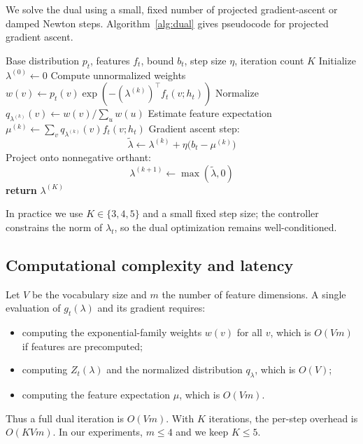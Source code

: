 \documentclass{article}
\theoremstyle{plain}
\theoremstyle{definition}
\theoremstyle{remark}
\begin{document}
We solve the dual using a small, fixed number of projected gradient-ascent or damped Newton steps.
Algorithm~\ref{alg:dual} gives pseudocode for projected gradient ascent.

\begin{algorithm}[t]
  \caption{Projected dual ascent for KL-based CaLaM}
  \label{alg:dual}
  \small
  \begin{algorithmic}[1]
    \REQUIRE Base distribution $p_t$, features $f_t$, bound $b_t$, step size $\eta$, iteration count $K$
    \STATE Initialize $\lambda^{(0)} \leftarrow 0$
      \STATE Compute unnormalized weights $w(v) \leftarrow p_t(v)\exp(-(\lambda^{(k)})^\top f_t(v;h_t))$
      \STATE Normalize $q_{\lambda^{(k)}}(v) \leftarrow w(v) / \sum_u w(u)$
      \STATE Estimate feature expectation $\mu^{(k)} \leftarrow \sum_v q_{\lambda^{(k)}}(v) f_t(v;h_t)$
      \STATE Gradient ascent step:
      \[
        \tilde{\lambda} \leftarrow \lambda^{(k)} + \eta\big(b_t - \mu^{(k)}\big)
      \]
      \STATE Project onto nonnegative orthant:
      \[
        \lambda^{(k+1)} \leftarrow \max(\tilde{\lambda}, 0)
      \]
    \ENDFOR
    \STATE \textbf{return} $\lambda^{(K)}$
  \end{algorithmic}
\end{algorithm}

In practice we use $K \in \{3,4,5\}$ and a small fixed step size; the controller constrains the norm of $\lambda_t$, so the dual optimization remains well-conditioned.

\subsection{Computational complexity and latency}
\label{app:complexity}

Let $V$ be the vocabulary size and $m$ the number of feature dimensions.
A single evaluation of $g_t(\lambda)$ and its gradient requires:

\begin{itemize}[leftmargin=1.5em]
  \item computing the exponential-family weights $w(v)$ for all $v$, which is $O(V m)$ if features are precomputed;
  \item computing $Z_t(\lambda)$ and the normalized distribution $q_\lambda$, which is $O(V)$;
  \item computing the feature expectation $\mu$, which is $O(V m)$.
\end{itemize}

Thus a full dual iteration is $O(V m)$.
With $K$ iterations, the per-step overhead is $O(K V m)$.
In our experiments, $m \le 4$ and we keep $K \le 5$.
\end{document}
